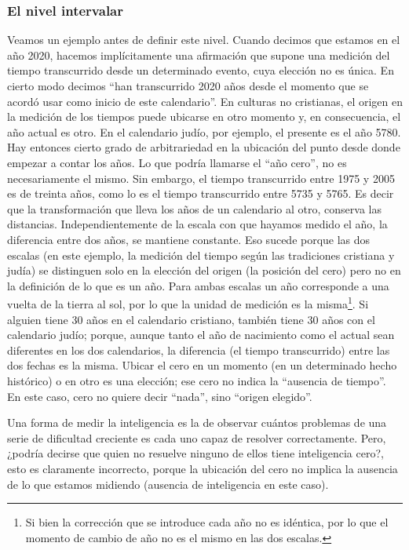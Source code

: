 \documentclass[]{book}
\let\rmarkdownfootnote\footnote%
\def\footnote{\protect\rmarkdownfootnote}
\begin{document}
\hypertarget{el-nivel-intervalar}{%
\subsubsection{El nivel intervalar}\label{el-nivel-intervalar}}

Veamos un ejemplo antes de definir este nivel. Cuando decimos que estamos en el año 2020, hacemos implícitamente una afirmación que supone una medición del tiempo transcurrido desde un determinado evento, cuya elección no es única. En cierto modo decimos ``han transcurrido 2020 años desde el momento que se acordó usar como inicio de este calendario''. En culturas no cristianas, el origen en la medición de los tiempos puede ubicarse en otro momento y, en consecuencia, el año actual es otro. En el calendario judío, por ejemplo, el presente es el año 5780. Hay entonces cierto grado de arbitrariedad en la ubicación del punto desde donde empezar a contar los años. Lo que podría llamarse el ``año cero'', no es necesariamente el mismo. Sin embargo, el tiempo transcurrido entre 1975 y 2005 es de treinta años, como lo es el tiempo transcurrido entre 5735 y 5765. Es decir que la transformación que lleva los años de un calendario al otro, conserva las distancias. Independientemente de la escala con que hayamos medido el año, la diferencia entre dos años, se mantiene constante. Eso sucede porque las dos escalas (en este ejemplo, la medición del tiempo según las tradiciones cristiana y judía) se distinguen solo en la elección del origen (la posición del cero) pero no en la definición de lo que es un año. Para ambas escalas un año corresponde a una vuelta de la tierra al sol, por lo que la unidad de medición es la misma\footnote{Si bien la corrección que se introduce cada año no es idéntica, por lo que el momento de cambio de año no es el mismo en las dos escalas.}. Si alguien tiene 30 años en el calendario cristiano, también tiene 30 años con el calendario judío; porque, aunque tanto el año de nacimiento como el actual sean diferentes en los dos calendarios, la diferencia (el tiempo transcurrido) entre las dos fechas es la misma. Ubicar el cero en un momento (en un determinado hecho histórico) o en otro es una elección; ese cero no indica la ``ausencia de tiempo''. En este caso, cero no quiere decir ``nada'', sino ``origen elegido''.

Una forma de medir la inteligencia es la de observar cuántos problemas de una serie de dificultad creciente es cada uno capaz de resolver correctamente. Pero, ¿podría decirse que quien no resuelve ninguno de ellos tiene inteligencia cero?, esto es claramente incorrecto, porque la ubicación del cero no implica la ausencia de lo que estamos midiendo (ausencia de inteligencia en este caso).
\end{document}
